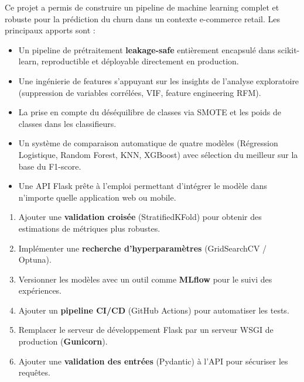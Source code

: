 \documentclass[11pt,a4paper]{article}
\begin{document}
Ce projet a permis de construire un pipeline de machine learning complet et robuste pour la prédiction du churn dans un contexte e-commerce retail. Les principaux apports sont :

\begin{itemize}[noitemsep]
    \item Un pipeline de prétraitement \textbf{leakage-safe} entièrement encapsulé dans scikit-learn, reproductible et déployable directement en production.
    \item Une ingénierie de features s'appuyant sur les insights de l'analyse exploratoire (suppression de variables corrélées, VIF, feature engineering RFM).
    \item La prise en compte du déséquilibre de classes via SMOTE et les poids de classes dans les classifieurs.
    \item Un système de comparaison automatique de quatre modèles (Régression Logistique, Random Forest, KNN, XGBoost) avec sélection du meilleur sur la base du F1-score.
    \item Une API Flask prête à l'emploi permettant d'intégrer le modèle dans n'importe quelle application web ou mobile.
\end{itemize}

\begin{tcolorbox}[title=Pistes d'amélioration]
\begin{enumerate}[noitemsep]
    \item Ajouter une \textbf{validation croisée} (StratifiedKFold) pour obtenir des estimations de métriques plus robustes.
    \item Implémenter une \textbf{recherche d'hyperparamètres} (GridSearchCV / Optuna).
    \item Versionner les modèles avec un outil comme \textbf{MLflow} pour le suivi des expériences.
    \item Ajouter un \textbf{pipeline CI/CD} (GitHub Actions) pour automatiser les tests.
    \item Remplacer le serveur de développement Flask par un serveur WSGI de production (\textbf{Gunicorn}).
    \item Ajouter une \textbf{validation des entrées} (Pydantic) à l'API pour sécuriser les requêtes.
\end{enumerate}
\end{tcolorbox}
\end{document}
